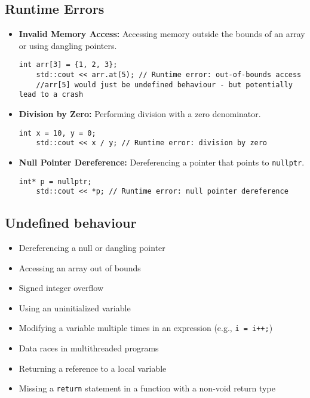 \subsection{Runtime Errors}
\begin{itemize}
    \item \textbf{Invalid Memory Access:} Accessing memory outside the bounds of an array or using dangling pointers.
    \begin{lstlisting}[style=codeexpert]
    int arr[3] = {1, 2, 3};
    std::cout << arr.at(5); // Runtime error: out-of-bounds access
    //arr[5] would just be undefined behaviour - but potentially lead to a crash
    \end{lstlisting}

    \item \textbf{Division by Zero:} Performing division with a zero denominator.
    \begin{lstlisting}[style=codeexpert]
    int x = 10, y = 0;
    std::cout << x / y; // Runtime error: division by zero
    \end{lstlisting}

    \item \textbf{Null Pointer Dereference:} Dereferencing a pointer that points to \texttt{nullptr}.
    \begin{lstlisting}[style=codeexpert]
    int* p = nullptr;
    std::cout << *p; // Runtime error: null pointer dereference
    \end{lstlisting}
\end{itemize}

\subsection{Undefined behaviour}
\begin{itemize}
    \item Dereferencing a null or dangling pointer
    \item Accessing an array out of bounds
    \item Signed integer overflow
    \item Using an uninitialized variable
    \item Modifying a variable multiple times in an expression (e.g., \texttt{i = i++;})
    \item Data races in multithreaded programs
    \item Returning a reference to a local variable
    \item Missing a \texttt{return} statement in a function with a non-void return type
\end{itemize}



